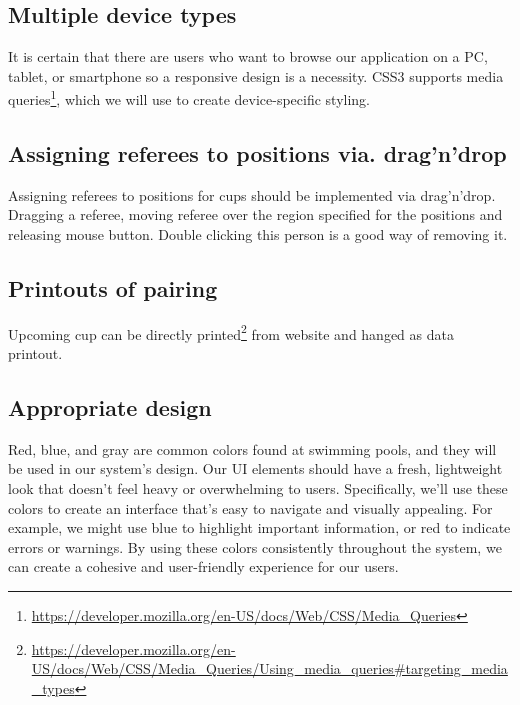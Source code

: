 \subsection*{Multiple device types}
It is certain that there are users who want to browse our application on a PC, tablet, or smartphone so a responsive design is a necessity. CSS3 supports media queries\footnote{\url{https://developer.mozilla.org/en-US/docs/Web/CSS/Media_Queries}}, which we will use to create device-specific styling.
\subsection*{Assigning referees to positions via. drag'n'drop}
Assigning referees to positions for cups should be implemented via drag'n'drop. Dragging a referee, moving referee over the region specified for the positions and releasing mouse button. Double clicking this person is a good way of removing it.
\subsection*{Printouts of pairing}
Upcoming cup can be directly printed\footnote{\url{https://developer.mozilla.org/en-US/docs/Web/CSS/Media_Queries/Using_media_queries\#targeting_media_types}} from website and hanged as data printout. 
\subsection*{Appropriate design}
Red, blue, and gray are common colors found at swimming pools, and they will be used in our system's design. Our UI elements should have a fresh, lightweight look that doesn't feel heavy or overwhelming to users. Specifically, we'll use these colors to create an interface that's easy to navigate and visually appealing. For example, we might use blue to highlight important information, or red to indicate errors or warnings. By using these colors consistently throughout the system, we can create a cohesive and user-friendly experience for our users.
